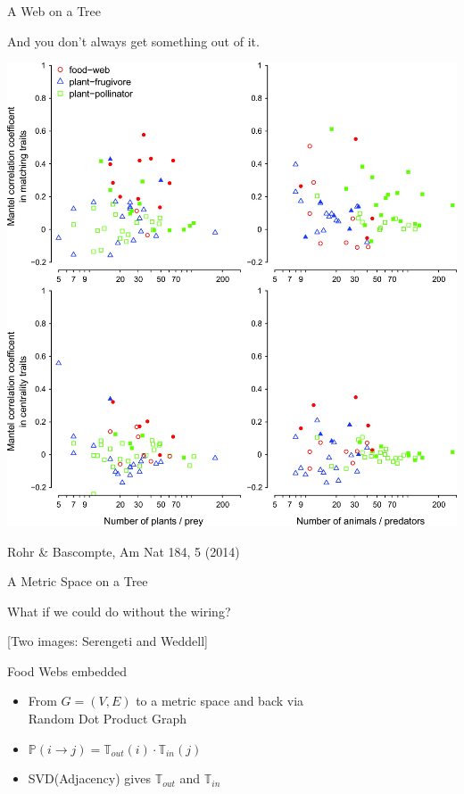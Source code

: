 \documentclass[]{beamer}
\begin{document}
\begin{frame}{A Web on a Tree}

\centering
And you don't always get something out of it.

\centering
\includegraphics[height=0.7 \textheight]{images/rohr.jpg}

\centering
{\tiny Rohr \& Bascompte, Am Nat 184, 5 (2014)}


\end{frame}


\begin{frame}{A Metric Space on a Tree}

What if we could do without the wiring?

{[}Two images: Serengeti and Weddell{]}

\end{frame}


\begin{frame}{Food Webs embedded}

\centering
\begin{itemize}[<+->]
\itemsep1pt\parskip0pt
\item
From $G=(V,E)$ to a metric space and back via\\
Random Dot Product Graph
\item
$\mathbb{P}\left( i \to j\right) = \mathbb{T}_{out}\left(i\right) \cdot  \mathbb{T}_{in}\left(j\right)$
\item
SVD(Adjacency) gives $\mathbb{T}_{out}$ and $ \mathbb{T}_{in}$
\end{itemize}

\end{frame}
\end{document}
